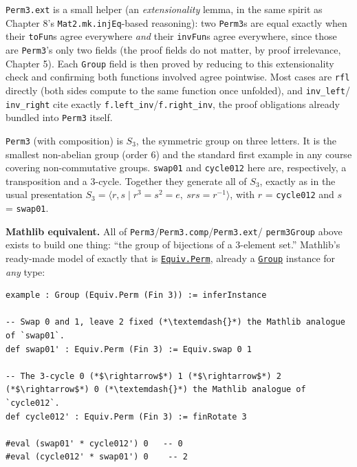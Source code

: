 \texttt{Perm3.ext} is a small helper (an \emph{extensionality} lemma, in the same spirit as Chapter 8's \texttt{Mat2.mk.injEq}-based reasoning): two \texttt{Perm3}s are equal exactly when their \texttt{toFun}s agree everywhere \emph{and} their \texttt{invFun}s agree everywhere, since those are \texttt{Perm3}'s only two fields (the proof fields do not matter, by proof irrelevance, Chapter 5). Each \texttt{Group} field is then proved by reducing to this extensionality check and confirming both functions involved agree pointwise. Most cases are \texttt{rfl} directly (both sides compute to the same function once unfolded), and \texttt{inv\_\allowbreak{}left}/ \texttt{inv\_\allowbreak{}right} cite exactly \texttt{f.left\_\allowbreak{}inv}/\texttt{f.right\_\allowbreak{}inv}, the proof obligations already bundled into \texttt{Perm3} itself.

\begin{mathreading}

\texttt{Perm3} (with composition) is \(S_3\), the symmetric group on three letters. It is the smallest non-abelian group (order \(6\)) and the standard first example in any course covering non-commutative groups. \texttt{swap01} and \texttt{cycle012} here are, respectively, a transposition and a 3-cycle. Together they generate all of \(S_3\), exactly as in the usual presentation \(S_3 = \langle r, s \mid r^3 = s^2 = e,\ srs
= r^{-1} \rangle\), with \(r\) = \texttt{cycle012} and \(s\) = \texttt{swap01}.

\end{mathreading}

\textbf{Mathlib equivalent.} All of \texttt{Perm3}/\texttt{Perm3.comp}/\texttt{Perm3.ext}/ \texttt{perm3Group} above exists to build one thing: ``the group of bijections of a 3-element set.'' Mathlib's ready-made model of exactly that is \href{https://loogle.lean-lang.org/?q=Equiv.Perm}{\texttt{Equiv.Perm}}, already a \href{https://loogle.lean-lang.org/?q=Group}{\texttt{Group}} instance for \emph{any} type:

\begin{lstlisting}
example : Group (Equiv.Perm (Fin 3)) := inferInstance

-- Swap 0 and 1, leave 2 fixed (*\textemdash{}*) the Mathlib analogue of `swap01`.
def swap01' : Equiv.Perm (Fin 3) := Equiv.swap 0 1

-- The 3-cycle 0 (*$\rightarrow$*) 1 (*$\rightarrow$*) 2 (*$\rightarrow$*) 0 (*\textemdash{}*) the Mathlib analogue of `cycle012`.
def cycle012' : Equiv.Perm (Fin 3) := finRotate 3

#eval (swap01' * cycle012') 0   -- 0
#eval (cycle012' * swap01') 0    -- 2
\end{lstlisting}

